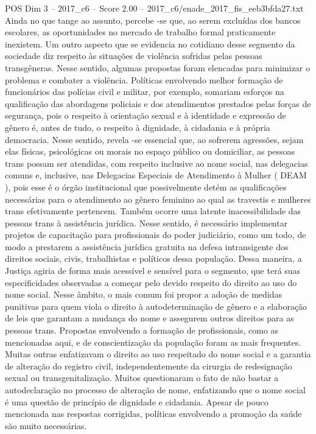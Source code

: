 \begin{textsample}{POS Dim 3 – 2017\_c6 – Score 2.00 – 2017\_c6/enade\_2017\_fis\_eeb3bfda27.txt}
Ainda no que tange ao assunto, percebe -se que, ao serem excluídas dos bancos escolares, as oportunidades no mercado de trabalho formal praticamente inexistem.
Um outro aspecto que se evidencia no cotidiano desse segmento da sociedade diz respeito às situações de violência sofridas pelas pessoas transgêneras.
Nesse sentido, algumas propostas foram elencadas para minimizar o problema e combater a violência.
Políticas envolvendo melhor formação de funcionários das polícias civil e militar, por exemplo, somariam esforços na qualificação das abordagens policiais e dos atendimentos prestados pelas forças de segurança, pois o respeito à orientação sexual e à identidade e expressão de gênero é, antes de tudo, o respeito à dignidade, à cidadania e à própria democracia.
Nesse sentido, revela -se essencial que, ao sofrerem agressões, sejam elas físicas, psicológicas ou morais no espaço público ou domiciliar, as pessoas trans possam ser atendidas, com respeito inclusive ao nome social, nas delegacias comuns e, inclusive, nas Delegacias Especiais de Atendimento à Mulher ( DEAM ), pois esse é o órgão institucional que possivelmente detém as qualificações necessárias para o atendimento ao gênero feminino ao qual as travestis e mulheres trans efetivamente pertencem.
Também ocorre uma latente inacessibilidade das pessoas trans à assistência jurídica.
Nesse sentido, é necessário implementar projetos de capacitação para profissionais do poder judiciário, como um todo, de modo a prestarem a assistência jurídica gratuita na defesa intransigente dos direitos sociais, civis, trabalhistas e políticos dessa população.
Dessa maneira, a Justiça agiria de forma mais acessível e sensível para o segmento, que terá suas especificidades observadas a começar pelo devido respeito do direito ao uso do nome social.
Nesse âmbito, o mais comum foi propor a adoção de medidas punitivas para quem viola o direito à autodeterminação de gênero e a elaboração de leis que garantam a mudança do nome e assegurem outros direitos para as pessoas trans.
Propostas envolvendo a formação de profissionais, como as mencionadas aqui, e de conscientização da população foram as mais frequentes.
Muitas outras enfatizavam o direito ao uso respeitado do nome social e a garantia de alteração do registro civil, independentemente da cirurgia de redesignação sexual ou transgenitalização.
Muitos questionaram o fato de não bastar a autodeclaração no processo de alteração de nome, enfatizando que o nome social é uma questão de princípio de dignidade e cidadania.
Apesar de pouco mencionada nas respostas corrigidas, políticas envolvendo a promoção da saúde são muito necessárias.

\end{textsample}
